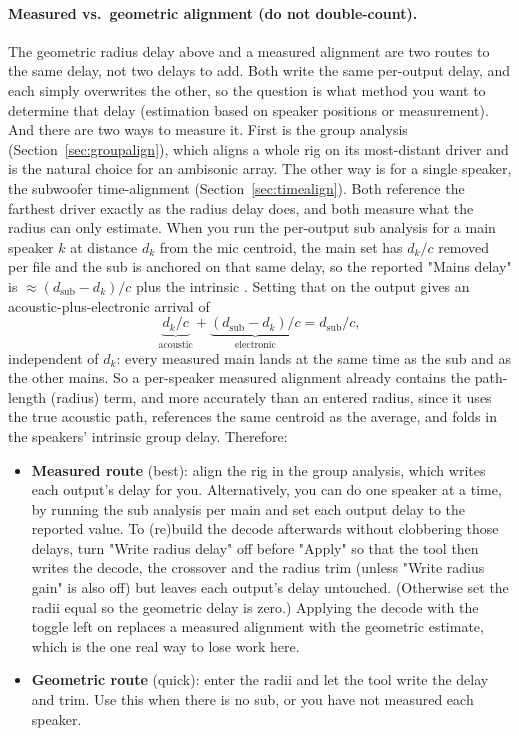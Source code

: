 \paragraph{Measured vs.\ geometric alignment (do not double-count).} The geometric radius delay above and a measured alignment are two routes to the same delay, not two delays to add. Both write the same per-output delay, and each simply overwrites the other, so the question is what method you want to determine that delay (estimation based on speaker positions or measurement). And there are two ways to measure it. First is the group analysis (Section~\ref{sec:groupalign}), which aligns a whole rig on its most-distant driver and is the natural choice for an ambisonic array. The other way is for a single speaker, the subwoofer time-alignment (Section~\ref{sec:timealign}). Both reference the farthest driver exactly as the radius delay does, and both measure what the radius can only estimate. When you run the per-output sub analysis for a main speaker $k$ at distance $d_k$ from the mic centroid, the main set has $d_k/c$ removed per file and the sub is anchored on that same delay, so the reported "Mains delay" is $\approx (d_{\mathrm{sub}}-d_k)/c$ plus the intrinsic . Setting that on the output gives an acoustic-plus-electronic arrival of
\begin{equation}
  \underbrace{d_k/c}_{\text{acoustic}} + \underbrace{(d_{\mathrm{sub}}-d_k)/c}_{\text{electronic}}
  = d_{\mathrm{sub}}/c,
\end{equation}
independent of $d_k$: every measured main lands at the same time as the sub and as the other mains. So a per-speaker measured alignment already contains the path-length (radius) term, and more accurately than an entered radius, since it uses the true acoustic path, references the same centroid as the average, and folds in the speakers' intrinsic group delay. Therefore:
\begin{itemize}[nosep]
  \item \textbf{Measured route} (best): align the rig in the group analysis, which writes each output's delay for you. Alternatively, you can do one speaker at a time, by running the sub analysis per main and set each output delay to the reported value. To (re)build the decode afterwards without clobbering those  delays, turn "Write radius delay" off before "Apply" so that the tool then writes the decode, the crossover and the radius trim (unless "Write radius gain" is also off) but leaves each output's delay untouched. (Otherwise set the radii equal so the geometric delay is zero.) Applying the decode with the toggle left on replaces a measured alignment with the geometric estimate, which is the one real way to lose work here.
  \item \textbf{Geometric route} (quick): enter the radii and let the tool write the delay and trim. Use this when there is no sub, or you have not measured each speaker.
\end{itemize}
